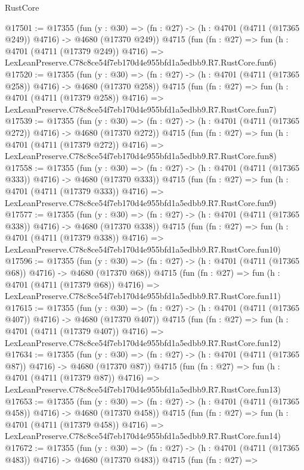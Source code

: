 \begin{lexlean}{RustCore}
\begin{coremodule}
@17501 := @17355
    (fun (y : @30) => (fn : @27) -> (h : @4701 (@4711 (@17365 @249)) @4716) -> @4680 (@17370 @249))
    @4715
    (fun (fn : @27) =>
    fun (h : @4701 (@4711 (@17379 @249)) @4716) =>
    LexLeanPreserve.C78c8ce54f7eb170d4e955bfd1a5edbb9.R7.RustCore.fun6)
@17520 := @17355
    (fun (y : @30) => (fn : @27) -> (h : @4701 (@4711 (@17365 @258)) @4716) -> @4680 (@17370 @258))
    @4715
    (fun (fn : @27) =>
    fun (h : @4701 (@4711 (@17379 @258)) @4716) =>
    LexLeanPreserve.C78c8ce54f7eb170d4e955bfd1a5edbb9.R7.RustCore.fun7)
@17539 := @17355
    (fun (y : @30) => (fn : @27) -> (h : @4701 (@4711 (@17365 @272)) @4716) -> @4680 (@17370 @272))
    @4715
    (fun (fn : @27) =>
    fun (h : @4701 (@4711 (@17379 @272)) @4716) =>
    LexLeanPreserve.C78c8ce54f7eb170d4e955bfd1a5edbb9.R7.RustCore.fun8)
@17558 := @17355
    (fun (y : @30) => (fn : @27) -> (h : @4701 (@4711 (@17365 @333)) @4716) -> @4680 (@17370 @333))
    @4715
    (fun (fn : @27) =>
    fun (h : @4701 (@4711 (@17379 @333)) @4716) =>
    LexLeanPreserve.C78c8ce54f7eb170d4e955bfd1a5edbb9.R7.RustCore.fun9)
@17577 := @17355
    (fun (y : @30) => (fn : @27) -> (h : @4701 (@4711 (@17365 @338)) @4716) -> @4680 (@17370 @338))
    @4715
    (fun (fn : @27) =>
    fun (h : @4701 (@4711 (@17379 @338)) @4716) =>
    LexLeanPreserve.C78c8ce54f7eb170d4e955bfd1a5edbb9.R7.RustCore.fun10)
@17596 := @17355
    (fun (y : @30) => (fn : @27) -> (h : @4701 (@4711 (@17365 @68)) @4716) -> @4680 (@17370 @68))
    @4715
    (fun (fn : @27) =>
    fun (h : @4701 (@4711 (@17379 @68)) @4716) =>
    LexLeanPreserve.C78c8ce54f7eb170d4e955bfd1a5edbb9.R7.RustCore.fun11)
@17615 := @17355
    (fun (y : @30) => (fn : @27) -> (h : @4701 (@4711 (@17365 @407)) @4716) -> @4680 (@17370 @407))
    @4715
    (fun (fn : @27) =>
    fun (h : @4701 (@4711 (@17379 @407)) @4716) =>
    LexLeanPreserve.C78c8ce54f7eb170d4e955bfd1a5edbb9.R7.RustCore.fun12)
@17634 := @17355
    (fun (y : @30) => (fn : @27) -> (h : @4701 (@4711 (@17365 @87)) @4716) -> @4680 (@17370 @87))
    @4715
    (fun (fn : @27) =>
    fun (h : @4701 (@4711 (@17379 @87)) @4716) =>
    LexLeanPreserve.C78c8ce54f7eb170d4e955bfd1a5edbb9.R7.RustCore.fun13)
@17653 := @17355
    (fun (y : @30) => (fn : @27) -> (h : @4701 (@4711 (@17365 @458)) @4716) -> @4680 (@17370 @458))
    @4715
    (fun (fn : @27) =>
    fun (h : @4701 (@4711 (@17379 @458)) @4716) =>
    LexLeanPreserve.C78c8ce54f7eb170d4e955bfd1a5edbb9.R7.RustCore.fun14)
@17672 := @17355
    (fun (y : @30) => (fn : @27) -> (h : @4701 (@4711 (@17365 @483)) @4716) -> @4680 (@17370 @483))
    @4715
    (fun (fn : @27) =>

\end{coremodule}
\end{lexlean}
